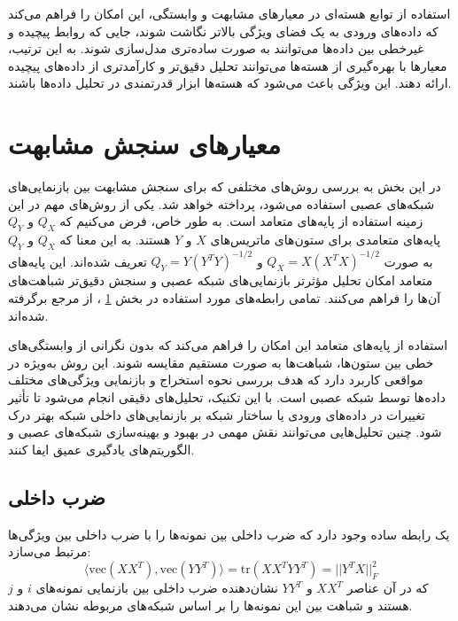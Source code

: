 استفاده از توابع هسته‌ای در معیارهای مشابهت و وابستگی، این امکان را فراهم می‌کند که داده‌های ورودی به یک فضای ویژگی بالاتر نگاشت شوند، جایی که روابط پیچیده و غیرخطی بین داده‌ها می‌توانند به صورت ساده‌تری مدل‌سازی شوند. به این ترتیب، معیارها با بهره‌گیری از هسته‌ها می‌توانند تحلیل دقیق‌تر و کارآمدتری از داده‌های پیچیده ارائه دهند. این ویژگی باعث می‌شود که هسته‌ها ابزار قدرتمندی در تحلیل داده‌ها باشند.



\section{
	معیار‌های سنجش مشابهت
}\label{sec_similarity_measurement_criteria}
در این بخش به بررسی روش‌های مختلفی که برای سنجش مشابهت بین بازنمایی‌های شبکه‌های عصبی استفاده می‌شود، پرداخته خواهد شد. یکی از روش‌های مهم در این زمینه استفاده از پایه‌های متعامد است. به طور خاص، فرض می‌کنیم که \( Q_X \) و \( Q_Y \) پایه‌های متعامدی برای ستون‌های ماتریس‌های \( X \) و \( Y \) هستند. به این معنا که \( Q_X \) و \( Q_Y \) به صورت \( Q_X = X(X^T X)^{-1/2} \) و \( Q_Y = Y(Y^T Y)^{-1/2} \) تعریف شده‌اند. این پایه‌های متعامد امکان تحلیل مؤثرتر بازنمایی‌های شبکه عصبی و سنجش دقیق‌تر شباهت‌های آن‌ها را فراهم می‌کنند.
تمامی رابطه‌های مورد استفاده در بخش
\ref{sec_similarity_measurement_criteria}%
، از مرجع 
\cite{kornblith2019similarity} 
برگرفته شده‌اند.


استفاده از پایه‌های متعامد این امکان را فراهم می‌کند که بدون نگرانی از وابستگی‌های خطی بین ستون‌ها، شباهت‌ها به صورت مستقیم مقایسه شوند. این روش به‌ویژه در مواقعی کاربرد دارد که هدف بررسی نحوه استخراج و بازنمایی ویژگی‌های مختلف داده‌ها توسط شبکه عصبی است. با این تکنیک، تحلیل‌های دقیقی انجام می‌شود تا تأثیر تغییرات در داده‌های ورودی یا ساختار شبکه بر بازنمایی‌های داخلی شبکه بهتر درک شود. چنین تحلیل‌هایی می‌توانند نقش مهمی در بهبود و بهینه‌سازی شبکه‌های عصبی و الگوریتم‌های یادگیری عمیق ایفا کنند.



\subsection{ضرب داخلی}
یک رابطه ساده وجود دارد که ضرب داخلی بین نمونه‌ها را با ضرب داخلی بین ویژگی‌ها مرتبط می‌سازد:
\begin{equation}
	\langle \text{vec}(XX^T), \text{vec}(YY^T) \rangle = \text{tr}(XX^TYY^T) = ||Y^TX||_F^2
	\label{eq_DotProduct}
\end{equation}
که در آن عناصر \(XX^T\) و \(YY^T\) نشان‌دهنده ضرب داخلی بین بازنمایی نمونه‌های \(i\) و \(j\) هستند و شباهت بین این نمونه‌ها را بر اساس شبکه‌های مربوطه نشان می‌دهند. 

